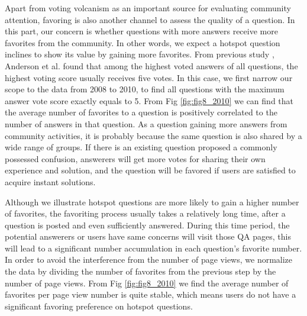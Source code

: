 Apart from voting volcanism as an important source for evaluating community attention, favoring is also another channel to assess the quality of a question. In this part, our concern is whether questions with more answers receive more favorites from the community. In other words, we expect a hotspot question inclines to show its value by gaining more favorites. From previous study \cite{anderson2012discovering}, Anderson et al. found that among the highest voted answers of all questions, the highest voting score usually receives five votes. In this case, we first narrow our scope to the data from 2008 to 2010, to find all questions with the maximum answer vote score exactly equals to 5. From Fig \ref{fig:fig8_2010} we can find that the average number of favorites to a question is positively correlated to the number of answers in that question. As a question gaining more answers from community activities, it is probably because the same question is also shared by a wide range of groups. If there is an existing question proposed a commonly possessed confusion, answerers will get more votes for sharing their own experience and solution, and the question will be favored if users are satisfied to acquire instant solutions. 

Although we illustrate hotspot questions are more likely to gain a higher number of favorites, the favoriting process usually takes a relatively long time, after a question is posted and even sufficiently answered. During this time period, the potential answerers or users have same concerns will visit those QA pages, this will lead to a significant number accumulation in each question's favorite number. In order to avoid the interference from the number of page views, we normalize the data by dividing the number of favorites from the previous step by the number of page views. From Fig \ref{fig:fig8_2010} we find the average number of favorites per page view number is quite stable, which means users do not have a significant favoring preference on hotspot questions. 

